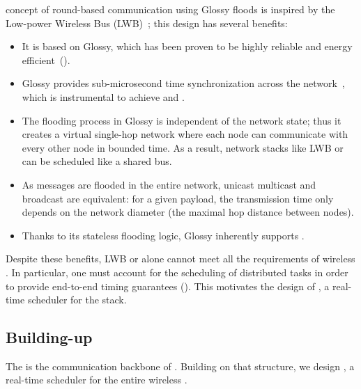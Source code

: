 \TTnet concept of round-based communication using Glossy floods is inspired by the Low-power Wireless Bus (LWB)~\cite{ferrari2012LWB}; this design has several benefits:
\begin{itemize}

	\item
	It is based on Glossy, which has been proven to be highly reliable and energy efficient~(\cite{schuss2017Competition,lim2017Competition,escobar-molero2019Improving}).

	\item
	Glossy provides sub-microsecond time synchronization across the network~\cite{ferrari2011Glossy}, which is instrumental to achieve  and .

	\item
	The flooding process in Glossy is independent of the network state; thus it creates a virtual single-hop network where each node can communicate with every other node in bounded time. As a result, network stacks like LWB or \TTnet can be scheduled like a shared bus.

	\item
	As messages are flooded in the entire network, unicast multicast and broadcast are equivalent: for a given payload, the transmission time only depends on the network diameter (the maximal hop distance between nodes).

	\item
	Thanks to its stateless flooding logic, Glossy inherently supports .

\end{itemize}

Despite these benefits, LWB or \TTnet alone cannot meet all the requirements of wireless \CPS. In particular, one must account for the scheduling of distributed tasks in order to provide end-to-end timing guarantees ().
\linebreak
This motivates the design of \TTW, a real-time scheduler for the \TTnet stack.

\subsection{Building-up \TTW}
\label{subsec:ttw_concepts}

The \TTnet is the communication backbone of \TTW.
Building on that structure, we design \TTW, a real-time scheduler for the entire wireless \CPS.

